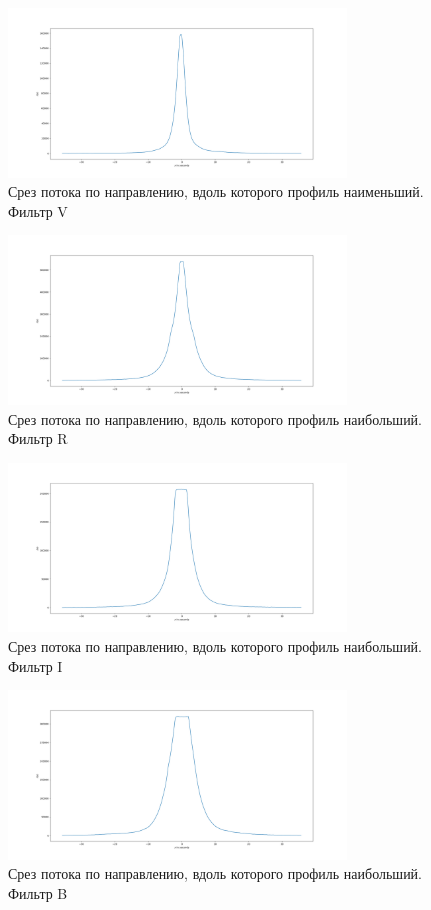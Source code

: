 \documentclass [12pt, a4paper] {article}
\theoremstyle{definition}
\begin{document}
		\begin{figure}
		\centering
			\includegraphics[width = 0.8\textwidth]{V_slice_min.png}
			\caption{Срез потока по направлению, вдоль которого профиль наименьший. Фильтр V}
\end{figure}
\begin{figure}
		\centering
			\includegraphics[width = 0.8\textwidth]{R_slice_max.png}
			\caption{Срез потока по направлению, вдоль которого профиль наибольший. Фильтр R}
		\end{figure}
		\begin{figure}
		\centering
			\includegraphics[width = 0.8\textwidth]{I_slice_max.png}
						\caption{Срез потока по направлению, вдоль которого профиль наибольший. Фильтр I}
		\end{figure}
		\begin{figure}
		\centering
			\includegraphics[width = 0.8\textwidth]{B_slice_max.png}
						\caption{Срез потока по направлению, вдоль которого профиль наибольший. Фильтр B}
					\end{figure}
\end{document}
